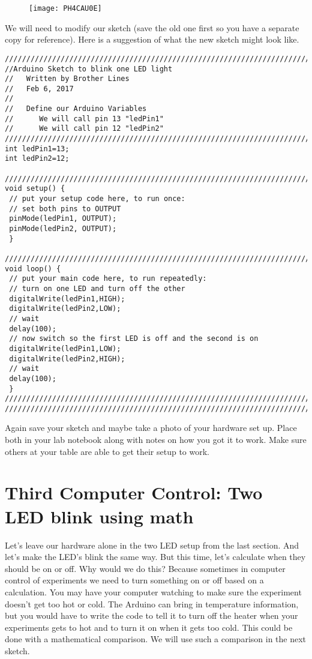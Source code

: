 \begin{figure}[h!]
\texttt{[image: PH4CAU0E]}
\end{figure}We will need to modify our sketch
(save the old one first so you have a separate copy for reference). Here is
a suggestion of what the new sketch might look like.
\begin{verbatim}
////////////////////////////////////////////////////////////////////////////
//Arduino Sketch to blink one LED light
//   Written by Brother Lines
//   Feb 6, 2017
//
//   Define our Arduino Variables
//      We will call pin 13 "ledPin1"
//      We will call pin 12 "ledPin2"
////////////////////////////////////////////////////////////////////////////
int ledPin1=13;
int ledPin2=12;
 
////////////////////////////////////////////////////////////////////////////
void setup() {
 // put your setup code here, to run once:
 // set both pins to OUTPUT
 pinMode(ledPin1, OUTPUT);
 pinMode(ledPin2, OUTPUT);
 }
 
////////////////////////////////////////////////////////////////////////////
void loop() {
 // put your main code here, to run repeatedly:
 // turn on one LED and turn off the other
 digitalWrite(ledPin1,HIGH);
 digitalWrite(ledPin2,LOW);
 // wait
 delay(100);
 // now switch so the first LED is off and the second is on
 digitalWrite(ledPin1,LOW);
 digitalWrite(ledPin2,HIGH);
 // wait
 delay(100);
 }
////////////////////////////////////////////////////////////////////////////
////////////////////////////////////////////////////////////////////////////
\end{verbatim}

Again save your sketch and maybe take a photo of your hardware set up. Place
both in your lab notebook along with notes on how you got it to work. Make
sure others at your table are able to get their setup to work.

\section{Third Computer Control: Two LED blink using math}

Let's leave our hardware alone in the two LED setup from the last section.
And let's make the LED's blink the same way. But this time, let's calculate
when they should be on or off. Why would we do this? Because sometimes in
computer control of experiments we need to turn something on or off based on
a calculation. You may have your computer watching to make sure the
experiment doesn't get too hot or cold. The Arduino can bring in temperature
information, but you would have to write the code to tell it to turn off the
heater when your experiments gets to hot and to turn it on when it gets too
cold. This could be done with a mathematical comparison. We will use such a
comparison in the next sketch.

